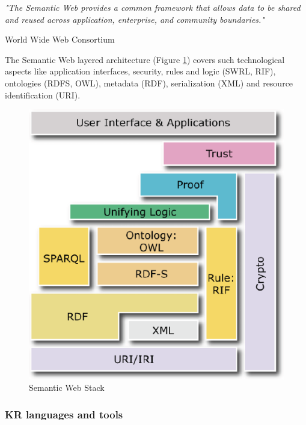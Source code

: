 \bigskip

\noindent \textit{"The Semantic Web provides a common framework that allows data to be shared and reused across application, enterprise, and community boundaries."}
\begin{flushright} World Wide Web Consortium \cite{SemWebActivity} \end{flushright}

\newpage

\noindent The Semantic Web layered architecture (Figure \ref{fig:semWebStack}) covers such technological aspects like application interfaces, security, rules and logic (SWRL, RIF), ontologies (RDFS, OWL), metadata (RDF), serialization (XML) and resource identification (URI).

\medskip

\begin{figure}[htp]
\centering
\includegraphics[scale=0.6]{images/chapter2/SemanticWebStack}
\caption{Semantic Web Stack \cite{GJNSemWeb}}
\label{fig:semWebStack}
\end{figure}

\subsubsection{KR languages and tools}
\label{sss:krLanguagesAndTools}

